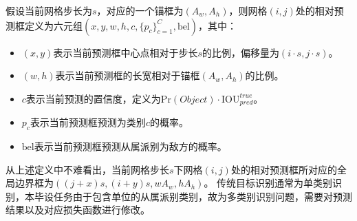 \begin{definition}[相对预测框]
  假设当前网格步长为$s$，对应的一个锚框为$(A_w,A_h)$，则网格$(i,j)$处的相对预测框定义为六元组$(x,y,w,h,c,\{p_c\}_{c=1}^C, \text{bel})$，其中：
  \begin{itemize}
    \item $(x,y)$表示当前预测框中心点相对于步长$s$的比例，偏移量为$(i\cdot s, j\cdot s)$。
    \item $(w,h)$表示当前预测框的长宽相对于锚框$(A_w,A_h)$的比例。
    \item $c$表示当前预测的置信度，定义为$\text{Pr}(Object)\cdot \text{IOU}_{pred}^{true}$。
    \item $p_c$表示当前预测框预测为类别$c$的概率。
    \item $\text{bel}$表示当前预测框预测从属派别为敌方的概率。
  \end{itemize}
\end{definition}
从上述定义中不难看出，当前网格步长$s$下网格$(i,j)$处的相对预测框所对应的全局边界框为$((j+x)s,(i+y)s, wA_w, hA_h)$。
传统目标识别通常为单类别识别，本毕设任务由于包含单位的从属派别类别，故为多类别识别问题，需要对预测结果以及对应损失函数进行修改。

